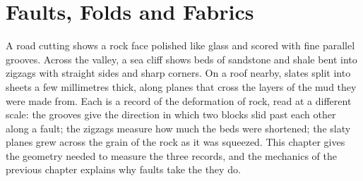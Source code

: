 \chapter{Faults, Folds and Fabrics}\label{ch:b1:faults-folds-fabrics}

A road cutting shows a rock face polished like glass and scored with fine
parallel grooves. Across the valley, a sea cliff shows beds of sandstone and
shale bent into zigzags with straight sides and sharp corners. On a roof
nearby, slates split into sheets a few millimetres thick, along planes that
cross the layers of the mud they were made from. Each is a record of the
deformation of rock, read at a different scale: the grooves give the direction
in which two blocks slid past each other along a fault; the zigzags measure how
much the beds were shortened; the slaty planes grew across the grain of the rock
as it was squeezed. This chapter gives the geometry needed to measure the three
records, and the mechanics of the previous chapter explains why faults take the
 they do.

